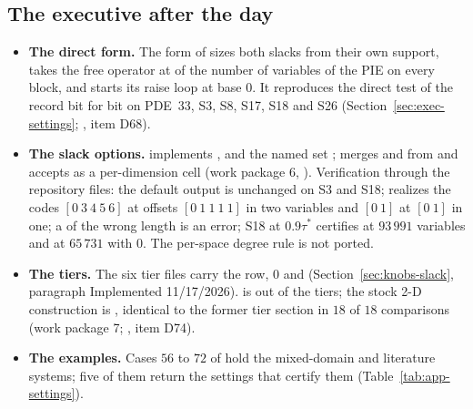 \subsection{The executive after the day}\label{sec:gaps-exec}

\begin{itemize}\setlength\itemsep{0pt}
\item \textbf{The direct form.} The  form of  sizes both slacks from their own support, takes the free operator at  of the number of variables of the PIE on every block, and starts its raise loop at base $0$. It reproduces the direct test of the record bit for bit on PDE~33, S3, S8, S17, S18 and S26 (Section~\ref{sec:exec-settings}; , item D68).
\item \textbf{The slack options.}  implements ,  and the named set ;  merges  and  from  and accepts  as a per-dimension cell (work package 6, ). Verification through the repository files: the default output is unchanged on S3 and S18;  realizes the codes $[0\ 3\ 4\ 5\ 6]$ at offsets $[0\ 1\ 1\ 1\ 1]$ in two variables and $[0\ 1]$ at $[0\ 1]$ in one; a  of the wrong length is an error; S18 at $0.9\tau^*$ certifies at $93\,991$ variables and at $65\,731$ with  $0$. The per-space degree rule is not ported.
\item \textbf{The tiers.} The six tier files carry the row,  $0$ and   (Section~\ref{sec:knobs-slack}, paragraph Implemented 11/17/2026).  is out of the tiers; the stock 2-D construction is , identical to the former tier section in $18$ of $18$ comparisons (work package 7; , item D74).
\item \textbf{The examples.} Cases $56$ to $72$ of  hold the mixed-domain and literature systems; five of them return the settings that certify them (Table~\ref{tab:app-settings}).
\end{itemize}
\endgroup
